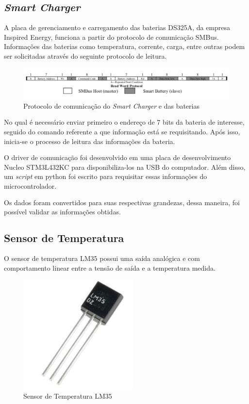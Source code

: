 	\subsection{\textit{Smart Charger}}
    
	    A placa de gerenciamento e carregamento das baterias DS325A, da empresa Inspired Energy, funciona a partir do protocolo de comunicação SMBus. Informações das baterias como temperatura, corrente, carga, entre outras podem ser solicitadas através do seguinte protocolo de leitura.
	    
	    \begin{figure}[!ht]
			   \centering
			   \includegraphics[width=16cm]{Figures/batt_protocol.png}
			   \caption{Protocolo de comunicação do \textit{Smart Charger} e das baterias}
			   \label{fig:batt_protocol}
		\end{figure}   
		
		No qual é necessário enviar primeiro o endereço de 7 bits da bateria de interesse, seguido do comando referente a que informação está se requisitando. Após isso, inicia-se o processo de leitura das informações da bateria.
		
		O driver de comunicação foi desenvolvido em uma placa de desenvolvimento Nucleo STM3L432KC para disponibiliza-los na USB do computador. Além disso, um \textit{script} em python foi escrito para requisitar essas informações do microcontrolador.
	    
	    Os dados foram convertidos para suas respectivas grandezas, dessa maneira, foi possível validar as informações obtidas.
    
    \subsection{Sensor de Temperatura}
    
	    O sensor de temperatura LM35 possui uma saída analógica e com comportamento linear entre a tensão de saída e a temperatura medida.
	    
	    \begin{figure}[!ht]
			   \centering
			   \includegraphics[width=6cm]{Figures/lm35.jpg}
			   \caption{Sensor de Temperatura LM35}
			   \label{fig:LM35}
		\end{figure}
	   
